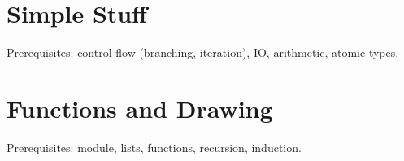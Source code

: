 



\section{Simple Stuff}
Prerequisites: control flow (branching, iteration), IO, arithmetic, atomic types.


\section{Functions and Drawing}
Prerequisites:  module, lists, functions, recursion, induction.


\clearpage
\doclicenseThis


